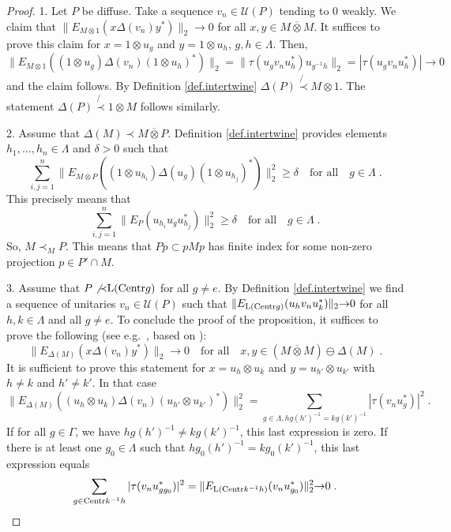 \documentclass[a4paper,11pt]{amsart}
\numberwithin{equation}{section}
\begin{document}
\begin{proof}
1. Let $P$ be diffuse. Take a sequence $v_n \in {\mathcal{U}}(P)$ tending to $0$ weakly. We claim that $\|E_{M {\otimes} 1}(x {\Delta}(v_n) y^*)\|_2 {\rightarrow} 0$ for all $x,y \in M {\mathbin{\overline{\otimes}}} M$. It suffices to prove this claim for $x=1 {\otimes} u_g$ and $y = 1 {\otimes} u_h$, $g,h \in \Lambda$. Then,
$$\|E_{M {\otimes} 1}((1 {\otimes} u_g) {\Delta}(v_n) (1 {\otimes} u_h)^*)\|_2 = \|\tau(u_g v_n u_h^*) u_{g^{-1}h}\|_2 = |\tau(u_g v_n u_h^*)| {\rightarrow} 0$$
and the claim follows. By Definition \ref{def.intertwine} ${\Delta}(P) \not{\prec} M {\otimes} 1$. The statement ${\Delta}(P) \not{\prec} 1 {\otimes} M$ follows similarly.

2. Assume that ${\Delta}(M) {\prec} M {\mathbin{\overline{\otimes}}} P$. Definition \ref{def.intertwine} provides elements $h_1,\ldots,h_n \in \Lambda$ and $\delta > 0$ such that
$$\sum_{i,j=1}^n \|E_{M {\mathbin{\overline{\otimes}}} P}((1 {\otimes} u_{h_i}) {\Delta}(u_g) (1 {\otimes} u_{h_j})^*)\|_2^2 {\geqslant} \delta \quad\text{for all}\quad g \in \Lambda \; .$$
This precisely means that
$$\sum_{i,j=1}^n \|E_P(u_{h_i} u_g u_{h_j}^*)\|_2^2 {\geqslant} \delta \quad\text{for all}\quad g \in \Lambda \; .$$
So, $M {\prec}_M P$. This means that $Pp \subset pMp$ has finite index for some non-zero projection $p \in P' \cap M$.

3. Assume that $P \not{\prec} {\mathord{\text{\rm L}}}({\operatorname{Centr}} g)$ for all $g \neq e$. By Definition \ref{def.intertwine} we find a sequence of unitaries $v_n \in {\mathcal{U}}(P)$ such that $\|E_{{\mathord{\text{\rm L}}}({\operatorname{Centr}} g)}(u_h v_n u_k^*)\|_2 {\rightarrow} 0$ for all $h,k \in \Lambda$ and all $g \neq e$. To conclude the proof of the proposition, it suffices to prove the following (see e.g.\ \cite[Lemma D.3]{Va06}, based on \cite[Theorem 3.1]{Po03}):
$$\|E_{{\Delta}(M)}(x {\Delta}(v_n) y^*)\|_2 {\rightarrow} 0 \quad\text{for all}\quad x,y \in (M {\mathbin{\overline{\otimes}}} M) \ominus {\Delta}(M) \; .$$
It is sufficient to prove this statement for $x = u_h {\otimes} u_k$ and $y = u_{h'} {\otimes} u_{k'}$ with $h \neq k$ and $h' \neq k'$. In that case
$$\|E_{{\Delta}(M)}((u_h {\otimes} u_k){\Delta}(v_n)(u_{h'} {\otimes} u_{k'})^*)\|_2^2 = \sum_{g \in \Lambda, hg(h')^{-1} = kg(k')^{-1}} |\tau(v_n u_g^*)|^2 \; .$$
If for all $g \in \Gamma$, we have $hg(h')^{-1} \neq kg(k')^{-1}$, this last expression is zero. If there is at least one $g_0 \in \Lambda$ such that $hg_0(h')^{-1} = kg_0(k')^{-1}$, this last expression equals
$$\sum_{g \in {\operatorname{Centr}} k^{-1}h} |\tau(v_n u_{gg_0}^*)|^2 = \|E_{{\mathord{\text{\rm L}}}({\operatorname{Centr}} k^{-1}h)}(v_n u_{g_0}^*)\|_2^2 {\rightarrow} 0 \; .$$


\end{proof}
\end{document}
